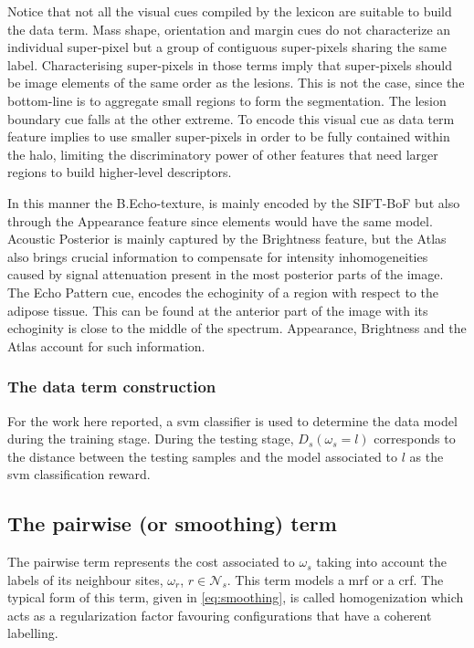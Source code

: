 Notice that not all the visual cues compiled by the lexicon are suitable to build the data term.
Mass shape, orientation and margin cues do not characterize an individual super-pixel but a group of contiguous super-pixels sharing the same label.
Characterising super-pixels in those terms imply that super-pixels should be image elements of the same order as the lesions. 
This is not the case, since the bottom-line is to aggregate small regions to form the segmentation.
The lesion boundary cue falls at the other extreme.
To encode this visual cue as data term feature implies to use smaller super-pixels in order to be fully contained within the halo, limiting the discriminatory power of other features that need larger regions to build higher-level descriptors.

In this manner the B.Echo-texture, is mainly encoded by the SIFT-BoF but also through the Appearance feature since elements would have the same model.
Acoustic Posterior is mainly captured by the Brightness feature, but the Atlas also brings crucial information to compensate for intensity inhomogeneities caused by signal attenuation present in the most posterior parts of the image.
The Echo Pattern cue, encodes the echoginity of a region with respect to the adipose tissue. This can be found at the anterior part of the image with its echoginity is close to the middle of the spectrum. Appearance, Brightness and the Atlas account for such information.

\subsubsection{The data term construction}
For the work here reported, a \ac{svm} classifier is used to determine the data model during the training stage.
During the testing stage, $D_s(\omega_s=l)$ corresponds to the distance between the testing samples and the model associated to $l$ as the \ac{svm} classification reward. 

\subsection{The pairwise (or smoothing) term} \label{sec:method:mrfTerm}
 
The pairwise term represents the cost associated to $\omega_s$ taking into account the labels of its neighbour sites, $\omega_r$, $r \in \mathcal{N}_{s}$. 
This term models a \ac{mrf} or a \ac{crf}.
The typical form of this term, given in \cref{eq:smoothing}, is called homogenization which acts as a regularization factor favouring configurations that have a coherent labelling.

